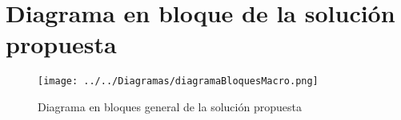 \documentclass[12pt]{article}
\begin{document}
\newpage

\section{Diagrama en bloque de la solución propuesta}

\begin{figure}[h!]
 \centering
 \texttt{[image: ../../Diagramas/diagramaBloquesMacro.png]}
 \caption{Diagrama en bloques general de la solución propuesta}
\end{figure}




    
\end{document}

